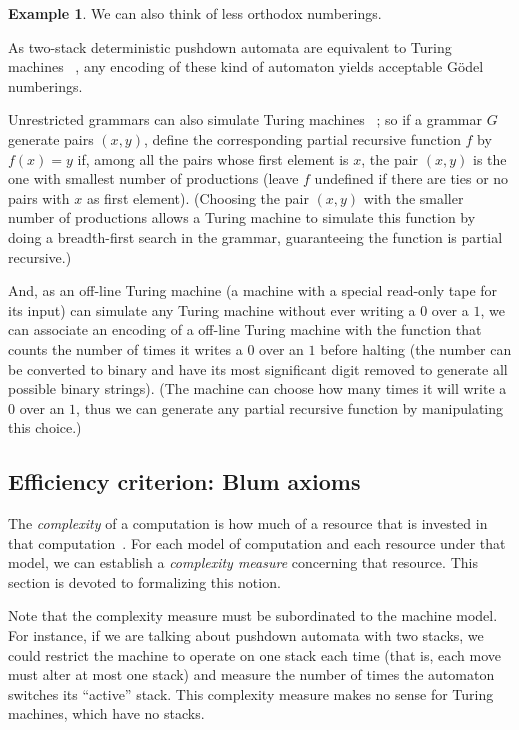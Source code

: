 \documentclass[12pt]{article}
\theoremstyle{definition}
\newtheorem{example}[definition]{Example}
\begin{document}
\begin{example}
    We can also think of less orthodox numberings.

    As two-stack deterministic pushdown automata are equivalent to Turing machines%
    ~\cite[p.~172]{HopcroftUllman1979},
    any encoding of these kind of automaton yields acceptable Gödel numberings.

    Unrestricted grammars can also simulate Turing machines%
    ~\cite[p.~221]{HopcroftUllman1979};
    so if a grammar $G$ generate pairs $(x, y)$,
    define the corresponding partial recursive function $f$
    by $f(x) = y$ if,
    among all the pairs whose first element is $x$,
    the pair $(x, y)$ is the one with smallest number of productions
    (leave $f$ undefined if there are ties or no pairs with $x$ as first element).
    (Choosing the pair $(x, y)$ with the smaller number of productions
    allows a Turing machine to simulate this function
    by doing a breadth-first search in the grammar,
    guaranteeing the function is partial recursive.)

    And, as an off-line Turing machine
    (a machine with a special read-only tape for its input)
    can simulate any Turing machine without ever writing a $0$ over a $1$,
    we can associate an encoding of a off-line Turing machine
    with the function that counts the number of times
    it writes a $0$ over an $1$ before halting
    (the number can be converted to binary and have its most significant digit removed
    to generate all possible binary strings).
    (The machine can choose how many times it will write a $0$ over an $1$,
    thus we can generate any partial recursive function by manipulating this choice.)
\end{example}

\subsection{Efficiency criterion: Blum axioms}
\label{sec:blum-axioms}

The \emph{complexity} of a computation is how much of a resource
that is invested in that computation~\cite[p.~285]{HopcroftUllman1979}.
For each model of computation and each resource under that model,
we can establish a \emph{complexity measure} concerning that resource.
This section is devoted to formalizing this notion.

Note that the complexity measure must be subordinated to the machine model.
For instance,
if we are talking about pushdown automata with two stacks,
we could restrict the machine to operate on one stack each time
(that is, each move must alter at most one stack)
and measure the number of times the automaton switches its ``active'' stack.
This complexity measure makes no sense for Turing machines,
which have no stacks.
\end{document}
